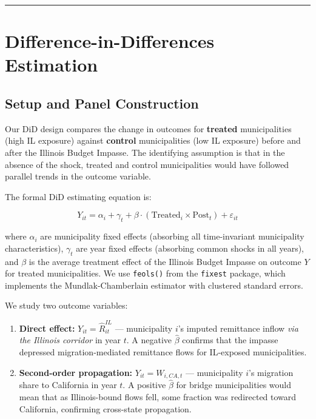 \documentclass[
  11pt,
  letterpaper,
  DIV=11,
  numbers=noendperiod]{scrartcl}
\providecommand{\tightlist}{%
  \setlength{\itemsep}{0pt}\setlength{\parskip}{0pt}}
\begin{document}
\begin{center}\rule{0.5\linewidth}{0.5pt}\end{center}

\section{Difference-in-Differences
Estimation}\label{difference-in-differences-estimation}

\subsection{Setup and Panel
Construction}\label{setup-and-panel-construction}

Our DiD design compares the change in outcomes for \textbf{treated}
municipalities (high IL exposure) against \textbf{control}
municipalities (low IL exposure) before and after the Illinois Budget
Impasse. The identifying assumption is that in the absence of the shock,
treated and control municipalities would have followed parallel trends
in the outcome variable.

The formal DiD estimating equation is:

\[Y_{it} = \alpha_i + \gamma_t + \beta \cdot (\text{Treated}_i \times \text{Post}_t) + \varepsilon_{it}\]

where \(\alpha_i\) are municipality fixed effects (absorbing all
time-invariant municipality characteristics), \(\gamma_t\) are year
fixed effects (absorbing common shocks in all years), and \(\beta\) is
the average treatment effect of the Illinois Budget Impasse on outcome
\(Y\) for treated municipalities. We use \texttt{feols()} from the
\texttt{fixest} package, which implements the Mundlak-Chamberlain
estimator with clustered standard errors.

We study two outcome variables:

\begin{enumerate}
\def\labelenumi{\arabic{enumi}.}
\tightlist
\item
  \textbf{Direct effect:} \(Y_{it} = \hat{R}_{it}^{IL}\) ---
  municipality \(i\)'s imputed remittance inflow \emph{via the Illinois
  corridor} in year \(t\). A negative \(\hat{\beta}\) confirms that the
  impasse depressed migration-mediated remittance flows for IL-exposed
  municipalities.
\item
  \textbf{Second-order propagation:} \(Y_{it} = W_{i,CA,t}\) ---
  municipality \(i\)'s migration share to California in year \(t\). A
  positive \(\hat{\beta}\) for bridge municipalities would mean that as
  Illinois-bound flows fell, some fraction was redirected toward
  California, confirming cross-state propagation.
\end{enumerate}
\end{document}
